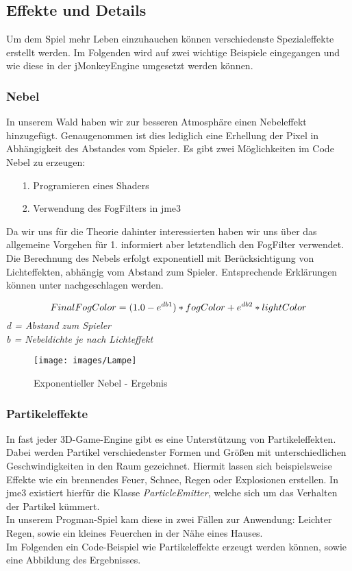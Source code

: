 \subsection{Effekte und Details}
Um dem Spiel mehr Leben einzuhauchen können verschiedenste Spezialeffekte erstellt werden. Im Folgenden wird auf zwei wichtige Beispiele eingegangen und wie diese in der jMonkeyEngine umgesetzt werden können.

\subsubsection{Nebel}
In unserem Wald haben wir zur besseren Atmosphäre einen Nebeleffekt hinzugefügt. Genaugenommen ist dies lediglich eine Erhellung der Pixel in Abhängigkeit des Abstandes vom Spieler. Es gibt zwei Möglichkeiten im Code Nebel zu erzeugen:

\begin{enumerate}
	\item[1.] Programieren eines Shaders 
	\item[2.] Verwendung des FogFilters in jme3
\end{enumerate}
Da wir uns für die Theorie dahinter interessierten haben wir uns über das allgemeine Vorgehen für 1. informiert aber letztendlich den FogFilter verwendet.
Die Berechnung des Nebels erfolgt exponentiell mit Berücksichtigung von Lichteffekten, abhängig vom Abstand zum Spieler. Entsprechende Erklärungen können unter \cite{Cr14} nachgeschlagen werden.

\begin{equation}
	FinalFogColor = (1.0-e^{db\textrm{1}})*fogColor + e^{db\textrm{2}} * lightColor \\
\end{equation} \emph{
	d = Abstand zum Spieler} \\
	\emph{b = Nebeldichte je nach Lichteffekt} 


\begin{figure}[H]
	\myfloatalign
	\caption{Exponentieller Nebel - Ergebnis}
	
	\texttt{[image: images/Lampe]} 
	
\end{figure}

\subsubsection{Partikeleffekte}
In fast jeder 3D-Game-Engine gibt es eine Unterstützung von Partikeleffekten. Dabei werden Partikel verschiedenster Formen und Größen mit unterschiedlichen Geschwindigkeiten in den Raum gezeichnet. Hiermit lassen sich beispielsweise Effekte wie ein brennendes Feuer, Schnee, Regen oder Explosionen erstellen. In jme3 existiert hierfür die Klasse \emph{ParticleEmitter}, welche sich um das Verhalten der Partikel kümmert.\\
In unserem Progman-Spiel kam diese in zwei Fällen zur Anwendung: Leichter Regen, sowie ein kleines Feuerchen in der Nähe eines Hauses.\\ Im Folgenden ein Code-Beispiel wie Partikeleffekte erzeugt werden können, sowie eine Abbildung des Ergebnisses.

